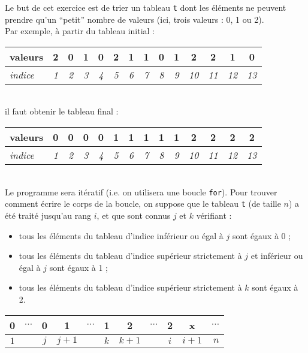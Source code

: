 \exer{}
\setcounter{numques}{0}

Le but de cet exercice est de trier un tableau \texttt{t} dont les éléments ne
peuvent prendre qu'un ``petit'' nombre de valeurs (ici, trois valeurs : 0, 1 ou
2).\\
Par exemple, à partir du tableau initial :\\

\begin{tabular}{|l|c|c|c|c|c|c|c|c|c|c|c|c|c|}
 \hline
 valeurs&\bf 2&\bf 0&\bf 1&\bf 0&\bf 2&\bf 1&\bf 1&\bf 0&\bf 1&\bf
2&\bf 2&\bf 1&\bf 0\\ \hline
 \it indice&\it 1&\it 2&\it 3&\it 4&\it 5&\it 6&\it
7&\it 8&\it 9&\it 10&\it 11&\it 12&\it 13\\\hline
 \end{tabular}
 \\
 
il faut obtenir le tableau final :\\

\begin{tabular}{|l|c|c|c|c|c|c|c|c|c|c|c|c|c|}
 \hline
 valeurs&\bf 0&\bf 0&\bf 0&\bf 0&\bf 1&\bf 1&\bf 1&\bf 1&\bf 1&\bf
2&\bf 2&\bf 2&\bf 2\\ \hline
 \it indice&\it 1&\it 2&\it 3&\it 4&\it 5&\it 6&\it
7&\it 8&\it 9&\it 10&\it 11&\it 12&\it 13\\\hline
 \end{tabular}
 \\
 
 Le programme sera itératif (i.e. on utilisera une boucle \texttt{for}). Pour
trouver comment écrire le corps de la boucle, on suppose que le tableau
\texttt{t} (de taille $n$) a été traité jusqu'au rang $i$, et que sont connus
$j$ et $k$ vérifiant :\\
\begin{itemize}
 \item tous les éléments du tableau d'indice inférieur ou égal à $j$ sont égaux
à 0 ;
\item tous les éléments du tableau d'indice supérieur strictement à $j$
et inférieur ou égal à $j$ sont égaux à 1 ;
\item tous les éléments du tableau d'indice supérieur strictement à $k$
sont égaux à 2.\\
\end{itemize}

\begin{tabular}{|ccc|ccc|ccc|c|c|}
 \hline 0&$\cdots$&0& 1&$\cdots$&1& 2&$\cdots$&2&x&$\cdots$\\
 \hline \multicolumn{1}{c}{$1$}& \multicolumn{1}{c}{}& \multicolumn{1}{c}{$j$}&
\multicolumn{1}{c}{$j+1$}& \multicolumn{1}{c}{}& \multicolumn{1}{c}{$k$}&
\multicolumn{1}{c}{$k+1$}& \multicolumn{1}{c}{}& \multicolumn{1}{c}{$i$}&
\multicolumn{1}{c}{$i+1$}& \multicolumn{1}{r}{$n$}
\end{tabular}
\\


